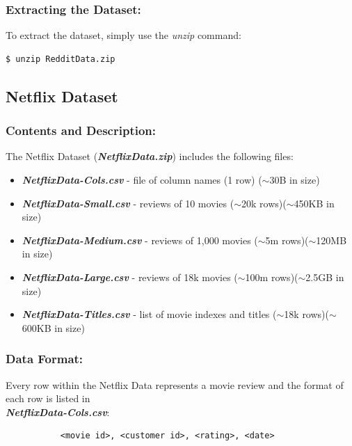 \documentclass{article}
\begin{document}
\subsubsection*{Extracting the Dataset:}
To extract the dataset, simply use the \textit{unzip} command:
\begin{commandline}\begin{verbatim}$ unzip RedditData.zip\end{verbatim}\end{commandline}



\subsection{Netflix Dataset}

\subsubsection*{Contents and Description:}
The Netflix Dataset (\textbf{\textit{NetflixData.zip}}) includes the following files:
\begin{itemize}
    \item \textit{\textbf{NetflixData-Cols.csv}} - file of column names (1 row) ($\sim$30B in size)
    \item \textit{\textbf{NetflixData-Small.csv}} - reviews of 10 movies ($\sim$20k rows)($\sim$450KB in size)
    \item \textit{\textbf{NetflixData-Medium.csv}} - reviews of 1,000 movies ($\sim$5m rows)($\sim$120MB in size)
    \item \textit{\textbf{NetflixData-Large.csv}} - reviews of 18k movies ($\sim$100m rows)($\sim$2.5GB in size)
    \item \textit{\textbf{NetflixData-Titles.csv}} - list of movie indexes and titles ($\sim$18k rows)($\sim$600KB in size)
\end{itemize}

\subsubsection*{Data Format:}
Every row within the Netflix Data represents a movie review and the format of each row is listed in \\ \textbf{\textit{NetflixData-Cols.csv}}:

\large
\begin{verbatim}
           <movie id>, <customer id>, <rating>, <date>
\end{verbatim}
\normalsize
\end{document}
